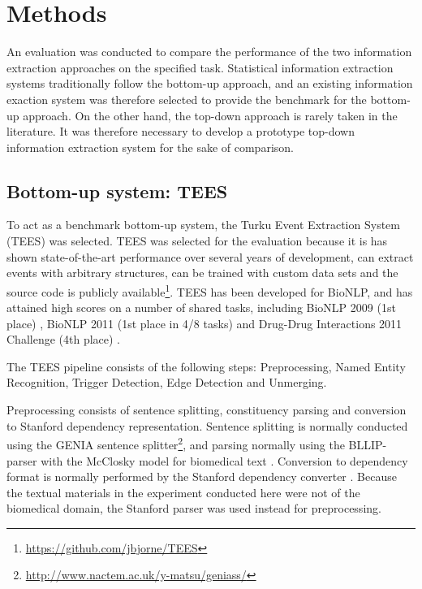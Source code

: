 \section{Methods}

An evaluation was conducted to compare the performance of the two information extraction approaches on the specified task. Statistical information extraction systems traditionally follow the bottom-up approach, and an existing information exaction system was therefore selected to provide the benchmark for the bottom-up approach. On the other hand, the top-down approach is rarely taken in the literature. It was therefore necessary to develop a prototype top-down information extraction system for the sake of comparison.

\subsection{Bottom-up system: TEES}

To act as a benchmark bottom-up system, the Turku Event Extraction System (TEES) \citep{bjö11ddi} was selected. TEES was selected for the evaluation because it is has shown state-of-the-art performance over several years of development, can extract events with arbitrary structures, can be trained with custom data sets and the source code is publicly available\footnote{\url{https://github.com/jbjorne/TEES}}. TEES has been developed for BioNLP, and has attained high scores on a number of shared tasks, including BioNLP 2009 (1st place) \citep{bjö09}, BioNLP 2011 (1st place in 4/8 tasks) \citep{bjö11} and Drug-Drug Interactions 2011 Challenge (4th place) \citep{bjö11ddi}.

The TEES pipeline consists of the following steps: Preprocessing, Named Entity Recognition, Trigger Detection, Edge Detection and Unmerging. 

Preprocessing consists of sentence splitting, constituency parsing and conversion to Stanford dependency representation. Sentence splitting is normally conducted using the GENIA sentence splitter\footnote{\url{http://www.nactem.ac.uk/y-matsu/geniass/}}, and parsing normally using the BLLIP-parser \citep{cha05} with the McClosky model for biomedical text \citep{mcc08}. Conversion to dependency format is normally performed by the Stanford dependency converter \citep{dem08}. Because the textual materials in the experiment conducted here were not of the biomedical domain, the Stanford parser \citep{kle03} was used instead for preprocessing.

